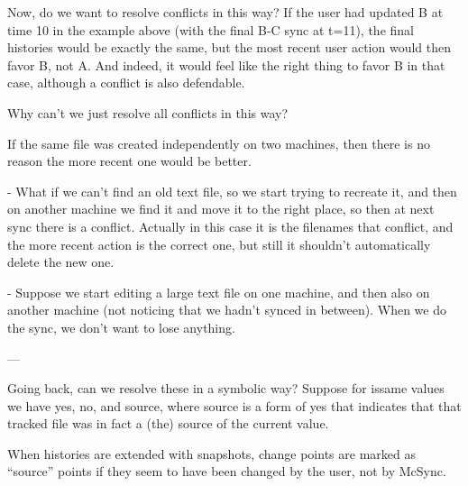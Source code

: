 \documentclass{book}
\begin{document}
Now, do we want to resolve conflicts in this way?
If the user had updated B at time 10 in the example above (with the final B-C sync at t=11), the final histories would be exactly the same, but the most recent user action would then favor B, not A.  And indeed, it would feel like the right thing to favor B in that case, although a conflict is also defendable.

Why can't we just resolve all conflicts in this way?

If the same file was created independently on two machines, then there is no reason the more recent one would be better.

- What if we can't find an old text file, so we start trying to recreate it, and then on another machine we find it and move it to the right place, so then at next sync there is a conflict.  Actually in this case it is the filenames that conflict, and the more recent action is the correct one, but still it shouldn't automatically delete the new one.

- Suppose we start editing a large text file on one machine, and then also on another machine (not noticing that we hadn't synced in between).  When we do the sync, we don't want to lose anything.

---

Going back, can we resolve these in a symbolic way?  Suppose for issame values we have yes, no, and source, where source is a form of yes that indicates that that tracked file was in fact a (the) source of the current value.

When histories are extended with snapshots, change points are marked as ``source'' points if they seem to have been changed by the user, not by McSync.
\end{document}
